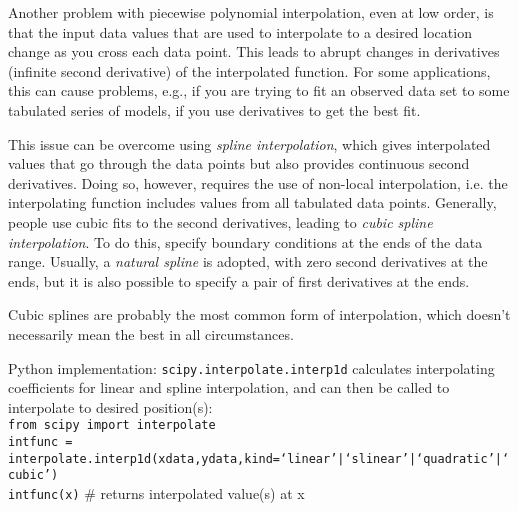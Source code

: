 \documentclass[12pt]{article}
\begin{document}
Another problem with piecewise polynomial interpolation, even at low order, is that
the input data values that are used to interpolate to a desired location change as
you cross each data point. This leads to abrupt changes in derivatives (infinite
second derivative) of the interpolated function. For some applications, this can
cause problems, e.g., if you are trying to fit an observed data set to some
tabulated series of models, if you use derivatives to get the best fit.

This issue can be overcome using \emph{spline interpolation}, which gives
interpolated values that go through the data points but also provides continuous
second derivatives. Doing so, however, requires the use of non-local interpolation,
i.e. the interpolating function includes values from all tabulated data points.
Generally, people use cubic fits to the second derivatives, leading to
\emph{cubic spline interpolation}. To do this, specify boundary conditions at
the ends of the data range. Usually, a \emph{natural spline} is adopted, with
zero second derivatives at the ends, but it is also possible to specify a pair
of first derivatives at the ends.

Cubic splines are probably the most common form of interpolation, which doesn't
necessarily mean the best in all circumstances.

Python implementation: \texttt{scipy.interpolate.interp1d} calculates
interpolating coefficients for linear and spline interpolation, and can then
be called to interpolate to desired position(s): \\

\noindent\texttt{from scipy import interpolate \\
intfunc = interpolate.interp1d(xdata,ydata,kind=`linear'|`slinear'|`quadratic'|`cubic') \\
intfunc(x)} $\#$ returns interpolated value(s) at x  \\
\end{document}
